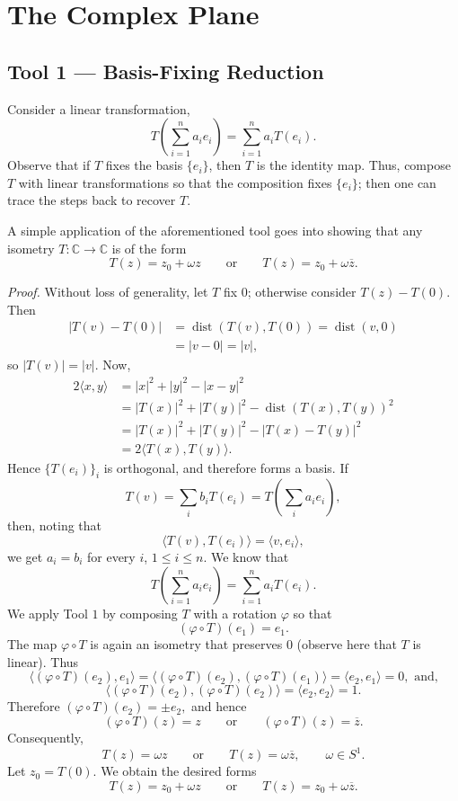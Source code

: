 \documentclass[11pt,a4paper]{article}
\begin{document}
\section*{The Complex Plane}

\subsection*{Tool 1 — Basis-Fixing Reduction}
Consider a linear transformation,
\[
T\left(\sum_{i=1}^{n}a_i e_i\right)=\sum_{i=1}^{n}a_iT(e_i).
\]
Observe that if $T$ fixes the basis $\{e_i\}$, then $T$ is the identity map. Thus, compose $T$ with linear transformations so that the composition fixes $\{e_i\}$; then one can trace the steps back to recover $T$.

A simple application of the aforementioned tool goes into showing that any isometry $T\colon\mathbb C\to\mathbb C$ is of the form
\[
T(z)=z_0+\omega z
\qquad\text{or}\qquad
T(z)=z_0+\omega\overline z.
\]


\textit{Proof.}
Without loss of generality, let $T$ fix $0$; otherwise consider $T(z)-T(0)$. Then
\begin{align*}
|T(v)-T(0)|
&=\operatorname{dist}(T(v),T(0))
 =\operatorname{dist}(v,0)\\
&=|v-0|=|v|,
\end{align*}
so $|T(v)|=|v|$. Now,
\begin{align*}
2\langle x,y\rangle
&=|x|^2+|y|^2-|x-y|^2\\
&=|T(x)|^2+|T(y)|^2-
  \operatorname{dist}(T(x),T(y))^2\\
&=|T(x)|^2+|T(y)|^2-|T(x)-T(y)|^2\\
&=2\langle T(x),T(y)\rangle.
\end{align*}
Hence $\{T(e_i)\}_i$ is orthogonal, and therefore forms a basis. If
\[
T(v)=\sum_i b_iT(e_i)=T\left(\sum_i a_ie_i\right),
\]
then, noting that
\[
\langle T(v),T(e_i)\rangle=\langle v,e_i\rangle,
\]
we get $a_i=b_i$ for every $i$, $1\leq i\leq n$. We know that
\[
T\left(\sum_{i=1}^{n}a_ie_i\right)=\sum_{i=1}^{n}a_iT(e_i).
\]
We apply Tool $1$ by composing $T$ with a rotation $\varphi$ so that
\[
(\varphi\circ T)(e_1)=e_1.
\]
The map $\varphi\circ T$ is again an isometry that preserves $0$ (observe here that $T$ is linear). Thus
\[
\langle(\varphi\circ T)(e_2),e_1\rangle
=\langle(\varphi\circ T)(e_2),(\varphi\circ T)(e_1)\rangle
 =\langle e_2,e_1\rangle=0, \text{ and,}
\]
\[
\langle(\varphi\circ T)(e_2),(\varphi\circ T)(e_2)\rangle
=\langle e_2,e_2\rangle=1.
\]
Therefore \((\varphi\circ T)(e_2)=\pm e_2,\)
and hence
\[
(\varphi\circ T)(z)=z\qquad\text{or}\qquad
(\varphi\circ T)(z)=\overline z.
\]
Consequently,
\[
T(z)=\omega z\qquad\text{or}\qquad T(z)=\omega\overline z,
\qquad \omega\in S^1.
\]
Let $z_0=T(0)$. We obtain the desired forms
\[
T(z)=z_0+\omega z
\qquad\text{or}\qquad
T(z)=z_0+\omega\overline z.
\]
\end{document}
